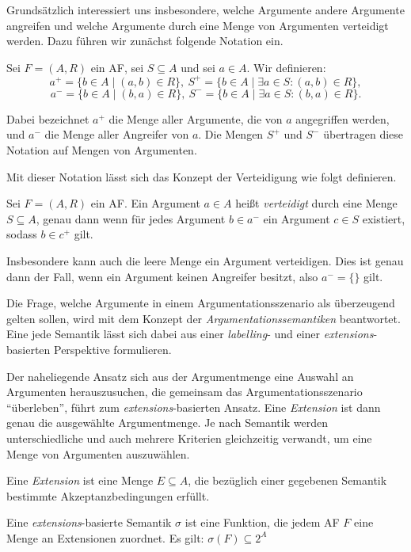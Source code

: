 Grundsätzlich interessiert uns insbesondere, welche Argumente andere Argumente
angreifen und welche Argumente durch eine Menge von Argumenten verteidigt
werden. Dazu führen wir zunächst folgende Notation ein.

\begin{Definition}
    \label{attack-object-subject}
    Sei \(F=(A,R)\) ein AF, sei \(S\subseteq A\) und sei \(a\in A\). Wir
    definieren:
    \[
        a^+ = \{b\in A \mid (a,b)\in R\},~
        S^+ = \{b\in A \mid \exists a\in S:(a,b)\in R\},
    \]
    \[
        a^- = \{b\in A \mid (b,a)\in R\},~
        S^- = \{b\in A \mid \exists a\in S:(b,a)\in R\}.
      \]
\end{Definition}

Dabei bezeichnet \(a^+\) die Menge aller Argumente, die von \(a\) angegriffen
werden, und \(a^-\) die Menge aller Angreifer von \(a\). Die Mengen \(S^+\)
und \(S^-\) übertragen diese Notation auf Mengen von Argumenten.

Mit dieser Notation lässt sich das Konzept der Verteidigung wie folgt definieren.
\begin{Definition}
    \label{def:defense}
    Sei \(F=(A,R)\) ein AF. Ein Argument \(a\in A\) heißt
    \emph{verteidigt} durch eine Menge \(S\subseteq A\), genau dann wenn
    für jedes Argument \(b\in a^-\) ein Argument \(c\in S\) existiert, sodass
      \(b\in c^+\) gilt.
\end{Definition}

Insbesondere kann auch die leere Menge ein Argument verteidigen. Dies ist genau
dann der Fall, wenn ein Argument keinen Angreifer besitzt, also \(a^-=\{\}\)
gilt.

Die Frage, welche Argumente in einem Argumentationsszenario als überzeugend gelten sollen, 
wird mit dem Konzept der \emph{Argumentationssemantiken} beantwortet.
Eine jede Semantik lässt sich dabei aus einer \emph{labelling}- und einer \emph{extensions}-basierten 
Perspektive formulieren. 

Der naheliegende Ansatz sich aus der Argumentmenge eine Auswahl an Argumenten herauszusuchen, die gemeinsam das
Argumentationsszenario \enquote{überleben}, führt zum \emph{extensions}-basierten Ansatz. 
Eine \emph{Extension} ist dann genau die ausgewählte Argumentmenge. Je nach Semantik werden unterschiedliche 
und auch mehrere Kriterien gleichzeitig verwandt, um eine Menge von Argumenten auszuwählen. 
\begin{Definition}
      \label{def:extension}
      Eine \emph{Extension} ist eine Menge \(E\subseteq A\), die bezüglich einer
      gegebenen Semantik bestimmte Akzeptanzbedingungen erfüllt.
\end{Definition}
\begin{Definition}
      \label{def:semantik}
      Eine \emph{extensions}-basierte Semantik $\sigma$ ist eine Funktion, die jedem AF \(F\) eine Menge an Extensionen zuordnet. 
      Es gilt: $\sigma(F) \subseteq 2^{A}$
\end{Definition}

